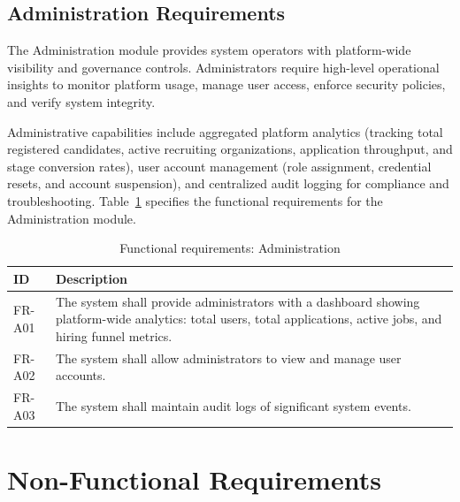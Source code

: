 \subsection{Administration Requirements}

The Administration module provides system operators with platform-wide visibility and governance controls. Administrators require high-level operational insights to monitor platform usage, manage user access, enforce security policies, and verify system integrity.

Administrative capabilities include aggregated platform analytics (tracking total registered candidates, active recruiting organizations, application throughput, and stage conversion rates), user account management (role assignment, credential resets, and account suspension), and centralized audit logging for compliance and troubleshooting. Table~\ref{tab:fr-admin} specifies the functional requirements for the Administration module.

\begin{table}[htbp]
\centering
\caption{Functional requirements: Administration}
\label{tab:fr-admin}
\small
\begin{tabular}{p{0.8in}p{4.8in}}
\toprule
\textbf{ID} & \textbf{Description} \\
\midrule
FR-A01 & The system shall provide administrators with a dashboard showing platform-wide analytics: total users, total applications, active jobs, and hiring funnel metrics. \\
FR-A02 & The system shall allow administrators to view and manage user accounts. \\
FR-A03 & The system shall maintain audit logs of significant system events. \\
\bottomrule
\end{tabular}
\end{table}

\section{Non-Functional Requirements}
\label{sec:nonfunctional-reqs}

